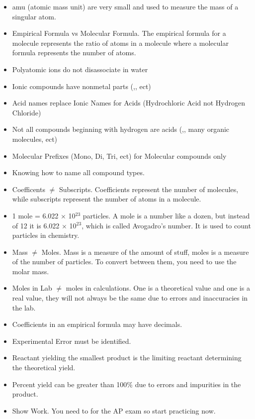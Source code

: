 \begin{itemize}
            \item amu (atomic mass unit) are very small and used to measure the mass of a singular atom. 
            \item Empirical Formula vs Molecular Formula. The empirical formula for a molecule represents the ratio of atoms in a molecule where a molecular formula represents the number of atoms. 
            \item Polyatomic ions do not disassociate in water
            \item Ionic compounds have nonmetal parts (,, ect)
            \item Acid names replace Ionic Names for Acids (Hydrochloric Acid not Hydrogen Chloride)
            \item Not all compounds beginning with hydrogen are acids (,, many organic molecules, ect)
            \item Molecular Prefixes (Mono, Di, Tri, ect) for Molecular compounds only
            \item Knowing how to name all compound types. 
            \item Coefficents $\neq$ Subscripts. Coefficients represent the number of molecules, while subscripts represent the number of atoms in a molecule.
            \item 1 mole = 6.022 $\times$ 10$^{23}$ particles. A mole is a number like a dozen, but instead of 12 it is 6.022 $\times$ 10$^{23}$, which is called Avogadro's number. It is used to count particles in chemistry.
            \item Mass $\neq$ Moles. Mass is a measure of the amount of stuff, moles is a measure of the number of particles. To convert between them, you need to use the molar mass.
            \item Moles in Lab $\neq$ moles in calculations. One is a theoretical value and one is a real value, they will not always be the same due to errors and inaccuracies in the lab.
            \item Coefficients in an empirical formula may have decimals. 
            \item Experimental Error must be identified.
            \item Reactant yielding the smallest product is the limiting reactant determining the theoretical yield.
            \item Percent yield can be greater than 100\% due to errors and impurities in the product.
            \item Show Work. You need to for the AP exam so start practicing now.
        \end{itemize}
